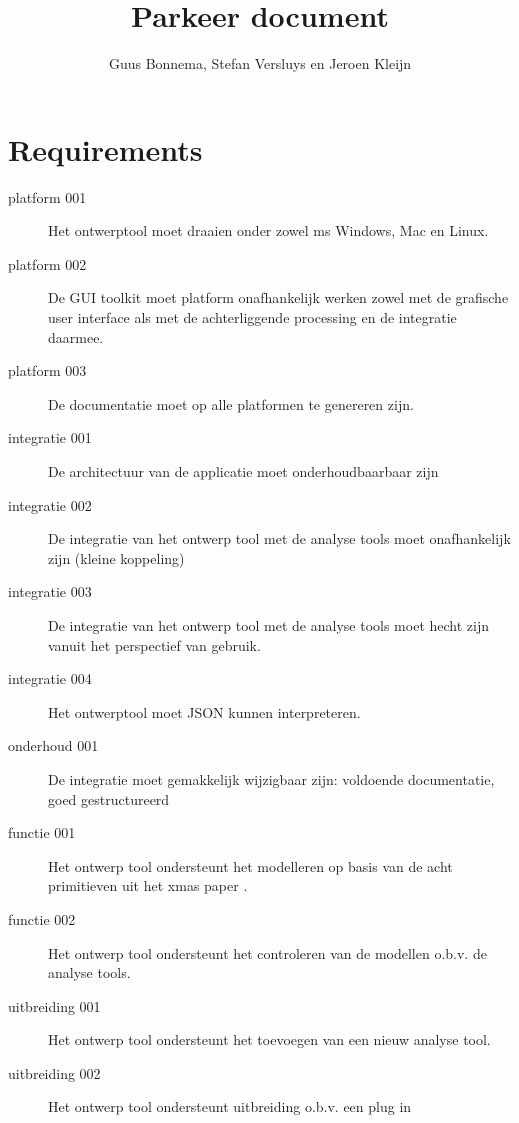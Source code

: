 \documentclass[a4paper,10pt]{article}
\title{Parkeer document}
\author{Guus Bonnema, Stefan Versluys en Jeroen Kleijn}
\begin{document}
\maketitle

\begin{abstract}

\end{abstract}

\section{Requirements}

\begin{description}
 \item[platform 001] Het ontwerptool moet draaien onder zowel ms Windows, Mac en Linux.
 \item[platform 002] De GUI toolkit moet platform onafhankelijk werken zowel met de
 grafische user interface als met de achterliggende processing en de integratie daarmee.
 \item[platform 003] De documentatie moet op alle platformen te genereren zijn.
 \item[integratie 001] De architectuur van de applicatie moet onderhoudbaarbaar zijn
 \item[integratie 002] De integratie van het ontwerp tool met de analyse tools moet onafhankelijk zijn (kleine koppeling)
 \item[integratie 003] De integratie van het ontwerp tool met de analyse tools moet hecht zijn
 vanuit het perspectief van gebruik.
 \item[integratie 004] Het ontwerptool moet JSON kunnen interpreteren.
 \item[onderhoud 001] De integratie moet gemakkelijk wijzigbaar zijn: voldoende documentatie, goed gestructureerd
 \item[functie 001] Het ontwerp tool ondersteunt het modelleren op basis van de acht primitieven uit het xmas paper \cite{chatterjee-kishinevsky:xmas}.
 \item[functie 002] Het ontwerp tool ondersteunt het controleren van de modellen o.b.v. de analyse tools.
 \item[uitbreiding 001] Het ontwerp tool ondersteunt het toevoegen van een nieuw analyse tool.
 \item[uitbreiding 002] Het ontwerp tool ondersteunt uitbreiding o.b.v. een plug in
\end{description}
\end{document}
